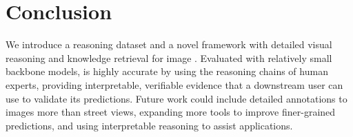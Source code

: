 \section{Conclusion}

We introduce a reasoning dataset \dataname and a novel framework \modelname with detailed visual reasoning and knowledge retrieval for image \geoloc. Evaluated with relatively small backbone models, \modelname is highly accurate by using the reasoning chains of human experts, providing interpretable, verifiable evidence that a downstream user can use to validate its predictions. Future work could include detailed annotations to images more than street views, expanding more tools to improve finer-grained predictions, and using interpretable reasoning to assist \geoloc applications.